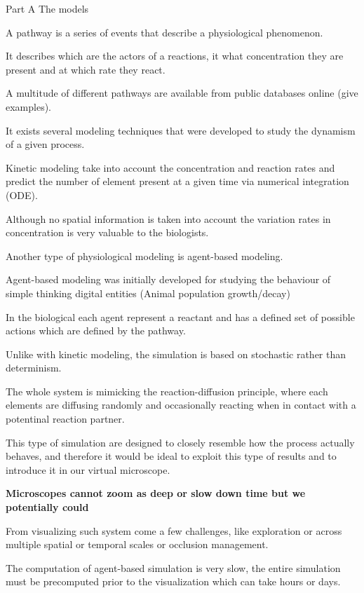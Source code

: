 Part A The models

A pathway is a series of events that describe a physiological phenomenon.

It describes which are the actors of a reactions, it what concentration they are present and at which rate they react.

A multitude of different pathways are available from public databases online (give examples).


It exists several modeling techniques that were developed to study the dynamism of a given process.

Kinetic modeling take into account the concentration and reaction rates and predict the number of element present at a given time via numerical integration (ODE).

Although no spatial information is taken into account the variation rates in concentration is very valuable to the biologists.


Another type of physiological modeling is agent-based modeling.

Agent-based modeling was initially developed for studying the behaviour of simple thinking digital entities (Animal population growth/decay)

In the biological each agent represent a reactant and has a defined set of possible actions which are defined by the pathway.

Unlike with kinetic modeling, the simulation is based on stochastic rather than determinism.

The whole system is mimicking the reaction-diffusion principle, where each elements are diffusing randomly and occasionally reacting when in contact with a potentinal reaction partner.



This type of simulation are designed to closely resemble how the process actually behaves, and therefore it would be ideal to exploit this type of results and to introduce it in our virtual microscope.

\textbf{Microscopes cannot zoom as deep or slow down time but we potentially could}

From visualizing such system come a few challenges, like exploration or across multiple spatial or temporal scales or occlusion management.



The computation of agent-based simulation is very slow, the entire simulation must be precomputed prior to the visualization which can take hours or days.


